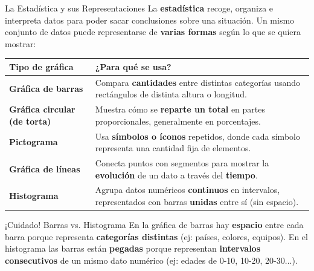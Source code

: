 \documentclass[12pt, letterpaper]{article}
\begin{document}
	\begin{concepto}{La Estadística y sus Representaciones}
		La \textbf{estadística} recoge, organiza e interpreta datos para poder
		sacar conclusiones sobre una situación. Un mismo conjunto de datos
		puede representarse de \textbf{varias formas} según lo que se quiera
		mostrar:
		
		\vspace{0.3cm}
		\renewcommand{\arraystretch}{1.8}
		\begin{center}
			\begin{longtable}{|>{\bfseries}m{3.3cm}|m{10.8cm}|}
				\hline
				\rowcolor{valblue!20}
				\textbf{Tipo de gráfica} & \textbf{¿Para qué se usa?} \\
				\hline
				Gráfica de \textcolor{valblue}{barras} &
				Compara \textbf{cantidades} entre distintas categorías usando
				rectángulos de distinta altura o longitud. \\
				\hline
				Gráfica \textcolor{valorange}{circular} (de torta) &
				Muestra cómo se \textbf{reparte un total} en partes
				proporcionales, generalmente en porcentajes. \\
				\hline
				\textcolor{valgreen}{Pictograma} &
				Usa \textbf{símbolos o íconos} repetidos, donde cada símbolo
				representa una cantidad fija de elementos. \\
				\hline
				Gráfica de \textcolor{valred}{líneas} &
				Conecta puntos con segmentos para mostrar la
				\textbf{evolución} de un dato a través del \textbf{tiempo}. \\
				\hline
				Histograma &
				Agrupa datos numéricos \textbf{continuos} en intervalos,
				representados con barras \textbf{unidas} entre sí (sin
				espacio). \\
				\hline
			\end{longtable}
		\end{center}
	\end{concepto}
	
	\begin{atencion}{¡Cuidado! Barras vs. Histograma}
		En la gráfica de barras hay \textbf{espacio} entre cada barra porque
		representa \textbf{categorías distintas} (ej: países, colores,
		equipos). En el histograma las barras están \textbf{pegadas} porque
		representan \textbf{intervalos consecutivos} de un mismo dato
		numérico (ej: edades de 0-10, 10-20, 20-30...).
	\end{atencion}
	
\end{document}
